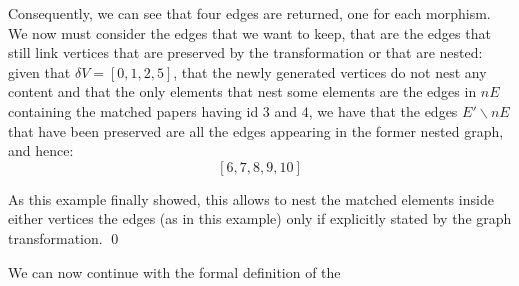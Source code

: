 \begin{example}[continues=ex:firstforgrammars2,label=ex:firstforgrammars3]
Consequently, we can see that four edges are returned, one for each morphism. We now must consider the edges that we want to keep, that are the edges that still link vertices that are preserved by the transformation or that are nested: given that $\delta V = [0,1,2,5]$, that the newly generated vertices do not nest any content and that the only elements that nest some elements are the edges in $ nE$ containing the matched papers having id $3$ and $4$, we have that the edges $E'\backslash nE$ that have been preserved  are all the edges appearing in the former nested graph, and hence:
\[[6,7,8,9,10]\]

As this example finally showed, this allows to nest the matched elements inside either vertices the edges (as in this example) only if explicitly stated by the graph transformation. \qed
\end{example}

We can now continue with the formal definition of the 

